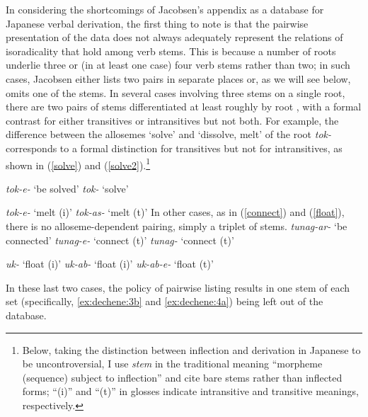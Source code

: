\documentclass[output=paper,
modfonts
]{LSP/langsci}
\begin{document}
In considering the shortcomings of Jacobsen's \citeyearpar{jacobsen1982a,jacobsen1992a} appendix as a
database for Japanese verbal derivation,  the first thing to note is that
the pairwise presentation of the data does not always adequately
represent the relations of isoradicality that hold among verb stems.
This is because a number of roots underlie three or (in at least one
case) four verb stems rather than two; in such cases, Jacobsen either
lists two pairs in separate places or, as we will see below, omits one
of the stems. In several cases involving three stems on a single root,
there are two pairs of stems differentiated at least roughly by root
, with a formal contrast for either transitives or intransitives
but not both. For example, the difference between the allosemes `solve'
and `dissolve, melt' of the root \textit{tok-} corresponds to a formal
distinction for transitives but not for intransitives, as shown in (\ref{solve})
and (\ref{solve2}).\footnote{Below, taking the distinction between inflection and
derivation in Japanese to be uncontroversial, I use \textit{stem} in the
traditional meaning ``morpheme (sequence) subject to inflection'' and cite
bare stems rather than inflected forms; ``(i)'' and ``(t)'' in glosses
indicate intransitive and transitive meanings, respectively.}


\ea \label{ex:dechene:1}\label{solve}
	\ea \label{ex:dechene:1a} \textit{tok-e-} `be solved' 
	\ex \label{ex:dechene:1b} \textit{tok-} `solve'
	\z

\ex \label{ex:dechene:2}\label{solve2} 
	\ea \label{ex:dechene:2a} \textit{tok-e-} `melt (i)'
	\ex \label{ex:dechene:2b} \textit{tok-as-} `melt (t)'
	\z
\z
In other cases, as in (\ref{connect}) and (\ref{float}), there is no alloseme-dependent
pairing, simply a triplet of  stems.
\ea \label{ex:dechene:3}\label{connect}
	\ea \label{ex:dechene:3a} \textit{tunag-ar-} `be connected'
	\ex \label{ex:dechene:3b} \textit{tunag-e-} `connect (t)'
	\ex \label{ex:dechene:3c} \textit{tunag-} `connect (t)'
	\z
	
\newpage 	
\ex \label{ex:dechene:4}\label{float} 
	\ea \label{ex:dechene:4a} \textit{uk-} `float (i)'
	\ex \label{ex:dechene:4b} \textit{uk-ab-} `float (i)'
	\ex \label{ex:dechene:4c} \textit{uk-ab-e-} `float (t)'
	\z
\z

\noindent In these last two cases, the policy of pairwise listing results in one
stem of each  set (specifically, \ref{ex:dechene:3b} and \ref{ex:dechene:4a}) being left out
of the database.
\end{document}
